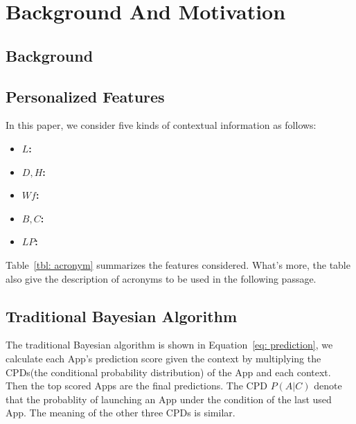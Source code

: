 \section{Background And Motivation}
\label{bkg_motivation}

\subsection{Background}
\label{bkg}



\subsection{Personalized Features \textit{\textbf{\large}}}
\label{feature}
In this paper, we consider five kinds of contextual information as follows:




\begin{itemize}
    \item \textbf{$L$:} 

    \item \textbf{$D, H$:} 

    \item \textbf{$Wf$:} 

    \item \textbf{$B, C$:} 

    \item \textbf{$LP$:} 
\end{itemize}


 Table~\ref{tbl: acronym} summarizes the features considered. What's more, the table also give the description of acronyms to be used in the following passage.


\subsection{Traditional Bayesian Algorithm \textit{\textbf{\large}}}
\label{traditional_algorithm}
 The traditional Bayesian algorithm is shown in Equation~\ref{eq: prediction}, we calculate each App's prediction score given the context by multiplying the CPDs(the conditional probability distribution) of the App and each context. Then the top scored Apps are the final predictions. The CPD $P(A | C)$ denote that the probablity of launching an App under the condition of the last used App. The meaning of the other three CPDs is similar.


